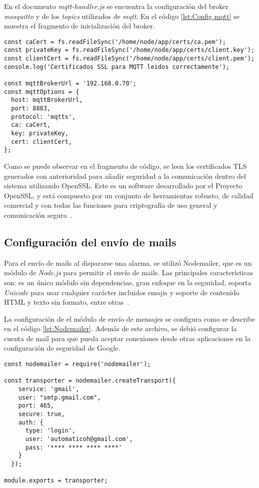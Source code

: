 En el documento \textit{mqtt-handler.js} se encuentra la configuración del broker \textit{mosquitto} y de los \textit{topics} utilizados de \textit{mqtt}. En el código \ref{lst:Config mqtt} se muestra el fragmento de inicialización del broker.

\begin{lstlisting}[caption={Inicialización del broker MQTT.}, label={lst:Config mqtt}]
const caCert = fs.readFileSync('/home/node/app/certs/ca.pem');
const privateKey = fs.readFileSync('/home/node/app/certs/client.key');
const clientCert = fs.readFileSync('/home/node/app/certs/client.pem');
console.log('Certificados SSL para MQTT leidos correctamente');

const mqttBrokerUrl = '192.168.0.70';
const mqttOptions = {
  host: mqttBrokerUrl,
  port: 8883,
  protocol: 'mqtts',
  ca: caCert,
  key: privateKey,
  cert: clientCert,
};
\end{lstlisting}

Como se puede observar en el fragmento de código, se leen los certificados TLS generados con anterioridad para añadir seguridad a la comunicación dentro del sistema utilizando OpenSSL. Este es un software desarrollado por el Proyecto OpenSSL, y está compuesto por un conjunto de herramientas robusto, de calidad comercial y con todas las funciones para criptografía de uso general y comunicación segura\ \citep{34}.

\subsection{Configuración del envío de mails}

Para el envío de mails al dispararse una alarma, se utilizó Nodemailer, que es un módulo de \textit{Node.js} para permitir el envío de mails. Las principales características son: es un único módulo sin dependencias, gran enfoque en la seguridad, soporta \textit{Unicode} para usar cualquier carácter incluidos emojis y soporte de contenido HTML y texto sin formato, entre otras\ \citep{35}.

La configuración de el módulo de envío de mensajes se configura como se describe en el código \ref{lst:Nodemailer}. Además de este archivo, se debió configurar la cuenta de mail para que pueda aceptar conexiones desde otras aplicaciones en la configuración de seguridad de Google.

\begin{lstlisting}[caption={Configuración del módulo de envío de mails.}, label={lst:Nodemailer}]
const nodemailer = require('nodemailer');

const transporter = nodemailer.createTransport({
    service: 'gmail',
    user: "smtp.gmail.com",
    port: 465,
    secure: true,
    auth: {
      type: 'login',
      user: 'automaticoh@gmail.com',
      pass: '**** **** **** ****'
    }
  });

module.exports = transporter;
\end{lstlisting}

